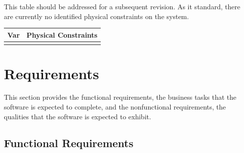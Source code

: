 \documentclass[12pt]{article}
\begin{document}
\noindent
\\
\\
This table should be addressed for a subsequent revision. As it standard, there are currently no 
identified physical constraints on the system.
\begin{table}[!h]
\caption{Output Variables} \label{TblOutputVar}
\renewcommand{\arraystretch}{1.2}
\noindent \begin{longtable*}{l l} 
  \toprule
  \textbf{Var} & \textbf{Physical Constraints} \\
  \midrule 

  \\
  \bottomrule
\end{longtable*}
\end{table}

\section{Requirements}\label{Header_Req}
This section provides the functional requirements, the business tasks that the
software is expected to complete, and the nonfunctional requirements, the
qualities that the software is expected to exhibit.

\subsection{Functional Requirements}
\end{document}
